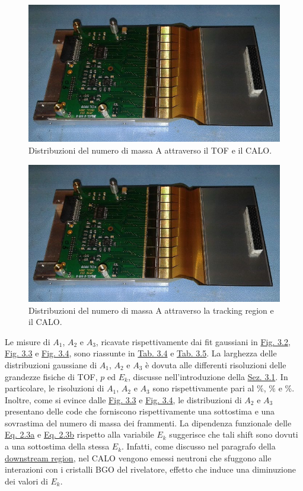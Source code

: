 \documentclass[12pt,a4paper,twoside]{report}
\begin{document}
	\begin{figure}[H]
		\centering
		\includegraphics[width=0.9\linewidth]{msd.jpg}
		\caption{Distribuzioni del numero di massa A attraverso il TOF e il CALO.}
		\label{fig:a2}
	\end{figure}
	\begin{figure}[H]
		\centering
		\includegraphics[width=0.9\linewidth]{msd.jpg}
		\caption{Distribuzioni del numero di massa A attraverso la tracking region e il CALO.}
		\label{fig:a3}
	\end{figure}
	Le misure di $A_1$, $A_2$ e $A_3$, ricavate rispettivamente dai fit gaussiani in \hyperref[fig:a1]{Fig. 3.2}, \hyperref[fig:a2]{Fig. 3.3} e \hyperref[fig:a3]{Fig. 3.4}, sono riassunte in \hyperref[tab:mass_numbers_a]{Tab. 3.4} e \hyperref[tab:mass_numbers_b]{Tab. 3.5}. La larghezza delle distribuzioni gaussiane di $A_1$, $A_2$ e $A_3$ è dovuta alle differenti risoluzioni delle grandezze fisiche di TOF, $p$ ed $E_k$, discusse nell'introduzione della \hyperref[sec:fragment_identification]{Sez. 3.1}. In particolare, le risoluzioni di $A_1$, $A_2$ e $A_3$ sono rispettivamente pari al $\%$, $\%$ e $\%$. Inoltre, come si evince dalle \hyperref[fig:a2]{Fig. 3.3} e \hyperref[fig:a3]{Fig. 3.4}, le distribuzioni di $A_2$ e $A_3$ presentano delle code che forniscono rispettivamente una sottostima e una sovrastima del numero di massa dei frammenti. La dipendenza funzionale delle \hyperref[eq:a1]{Eq. 2.3a} e \hyperref[eq:a2]{Eq. 2.3b} rispetto alla variabile $E_k$ suggerisce che tali shift sono dovuti a una sottostima della stessa $E_k$. Infatti, come discusso nel paragrafo della \hyperref[par:downstream_region]{downstream region}, nel CALO vengono emessi neutroni che sfuggono alle interazioni con i cristalli BGO del rivelatore, effetto che induce una diminuzione dei valori di $E_k$.
\end{document}
